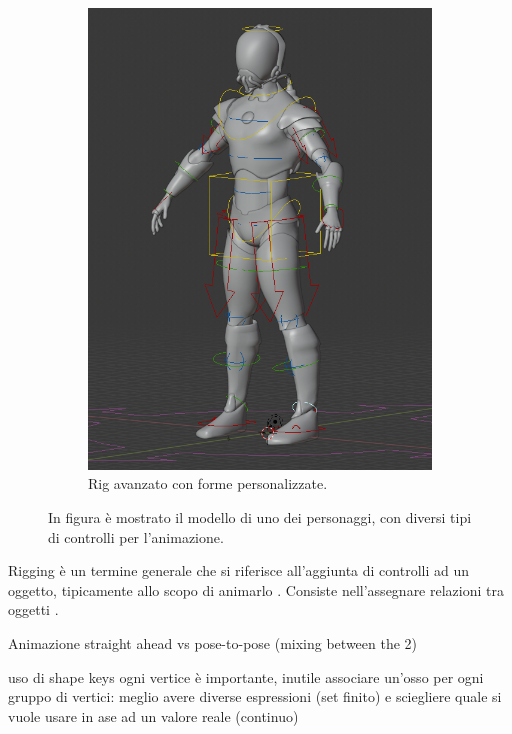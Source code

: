 \begin{figure}
\begin{subfigure}{.33\textwidth}
  \includegraphics[width=\linewidth]{Figures/rig2}
  \caption{Rig avanzato con forme personalizzate.}
  \label{fig:rig2}
\end{subfigure}
\decoRule
\caption[Confronto di rig]{In figura è mostrato il modello di uno dei personaggi, con diversi tipi di controlli per l'animazione.}
\label{fig:rig}
\end{figure}

Rigging è un termine generale che si riferisce all'aggiunta di controlli ad un oggetto, tipicamente allo scopo di animarlo \parencite{blendDoc}.
Consiste nell'assegnare relazioni tra oggetti \parencite{BlendTut}.

Animazione straight ahead vs pose-to-pose (mixing between the 2)

uso di shape keys
ogni vertice è importante, inutile associare un'osso per ogni gruppo di vertici: meglio avere diverse espressioni (set finito) e sciegliere quale si vuole usare in ase ad un valore reale (continuo)

